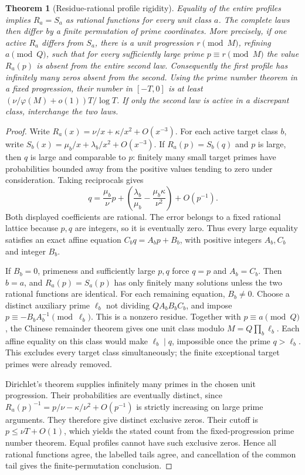 \documentclass[11pt]{article}
\newtheorem{theorem}{Theorem}[section]
\theoremstyle{definition}
\begin{document}
\begin{theorem}[Residue-rational profile rigidity]
Equality of the entire profiles implies $R_a=S_a$ as rational functions
for every unit class $a$. The complete laws then differ by a finite
permutation of prime coordinates.
More precisely, if one active $R_a$ differs from $S_a$, there is a unit
progression $r\pmod M$, refining $a\pmod Q$, such that for every
sufficiently large prime $p\equiv r\pmod M$ the value $R_a(p)$ is absent
from the entire second law.
Consequently the first profile has infinitely many zeros absent from
the second. Using the prime number theorem in a fixed progression,
their number in $[-T,0]$ is at least
$(\nu/\varphi(M)+o(1))T/\log T$.
If only the second law is active in a discrepant class, interchange
the two laws.
\end{theorem}
\begin{proof}
Write $R_a(x)=\nu/x+\kappa/x^2+O(x^{-3})$.
For each active target class $b$, write
$S_b(x)=\mu_b/x+\lambda_b/x^2+O(x^{-3})$.
If $R_a(p)=S_b(q)$ and $p$ is large, then $q$ is large and comparable
to $p$: finitely many small target primes have probabilities bounded
away from the positive values tending to zero under consideration.
Taking reciprocals gives
\[
 q=\frac{\mu_b}{\nu}p+
       \left(\frac{\lambda_b}{\mu_b}
                    -\frac{\mu_b\kappa}{\nu^2}\right)+O(p^{-1}).
\]
Both displayed coefficients are rational. The error belongs to a
fixed rational lattice because $p,q$ are integers, so it is eventually
zero. Thus every large equality satisfies an exact affine equation
$C_bq=A_bp+B_b$, with positive integers $A_b,C_b$ and integer $B_b$.

If $B_b=0$, primeness and sufficiently large $p,q$ force $q=p$ and
$A_b=C_b$. Then $b=a$, and $R_a(p)=S_a(p)$ has only finitely many
solutions unless the two rational functions are identical.
For each remaining equation, $B_b\ne0$. Choose a distinct auxiliary
prime $\ell_b$ not dividing $QA_bB_bC_b$, and impose
$p\equiv-B_bA_b^{-1}\pmod{\ell_b}$.
This is a nonzero residue. Together with $p\equiv a\pmod Q$, the
Chinese remainder theorem gives one unit class modulo
$M=Q\prod_b\ell_b$. Each affine equality on this class would make
$\ell_b\mid q$, impossible once the prime $q>\ell_b$.
This excludes every target class simultaneously; the finite
exceptional target primes were already removed.

Dirichlet's theorem supplies infinitely many primes in the chosen
unit progression. Their probabilities are eventually distinct,
since $R_a(p)^{-1}=p/\nu-\kappa/\nu^2+O(p^{-1})$ is strictly
increasing on large prime arguments. They therefore give distinct
exclusive zeros. Their cutoff is $p\le\nu T+O(1)$, which yields the
stated count from the fixed-progression prime number theorem.
Equal profiles cannot have such exclusive zeros. Hence all rational
functions agree, the labelled tails agree, and cancellation of the
common tail gives the finite-permutation conclusion.
\end{proof}
\end{document}
